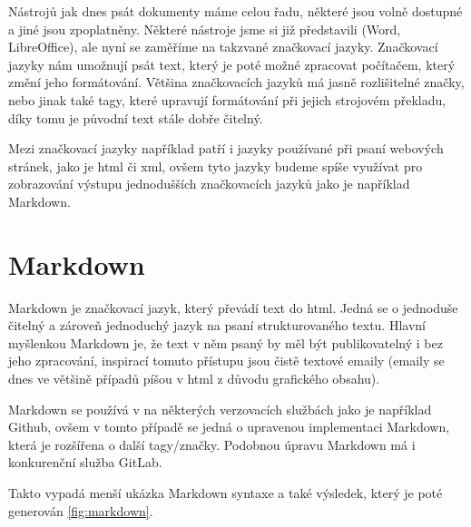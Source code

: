 Nástrojů jak dnes psát dokumenty máme celou řadu, některé jsou volně dostupné a jiné jsou zpoplatněny. Některé nástroje jsme si již představili (Word, LibreOffice), ale
nyní se zaměříme na takzvané značkovací jazyky. Značkovací jazyky nám umožnují psát text, který je poté možné zpracovat počítačem, který změní jeho formátování. Většina
značkovacích jazyků má jasně rozlišitelné značky, nebo jinak také tagy, které upravují formátování při jejich strojovém překladu, díky tomu je původní text stále dobře čitelný.
\cite{markup}

Mezi značkovací jazyky například patří i jazyky používané při psaní webových stránek, jako je \gls{html} či \gls{xml}, ovšem tyto jazyky budeme spíše využívat pro zobrazování výstupu
jednodušších značkovacích jazyků jako je například Markdown.

\section{Markdown}

Markdown je značkovací jazyk, který převádí text do \gls{html}. Jedná se o jednoduše čitelný a zároveň jednoduchý jazyk na psaní strukturovaného textu. Hlavní myšlenkou Markdown je, že
text v něm psaný by měl být publikovatelný i bez jeho zpracování, inspirací tomuto přístupu jsou čistě textové emaily (emaily se dnes ve většině případů píšou v \gls{html}
z důvodu grafického obsahu). \cite{markdown}

Markdown se používá v na některých verzovacích službách jako je například Github, ovšem v tomto případě se jedná o upravenou implementaci Markdown, která je rozšířena o další
tagy/značky. Podobnou úpravu Markdown má i konkurenční služba GitLab.

Takto vypadá menší ukázka Markdown syntaxe a také výsledek, který je poté generován \ref{fig:markdown}.

\clearpage

\inputminted[linenos,breaklines]{md}{example.md}

